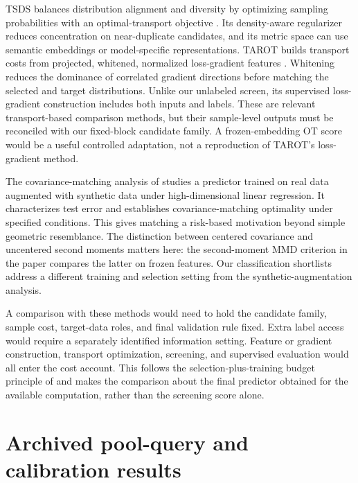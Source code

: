 \documentclass{article}
\begin{document}
TSDS balances distribution alignment and diversity by optimizing sampling probabilities with an optimal-transport objective \citep{liu2024tsds}. Its density-aware regularizer reduces concentration on near-duplicate candidates, and its metric space can use semantic embeddings or model-specific representations. TAROT builds transport costs from projected, whitened, normalized loss-gradient features \citep{feng2025tarot}. Whitening reduces the dominance of correlated gradient directions before matching the selected and target distributions. Unlike our unlabeled screen, its supervised loss-gradient construction includes both inputs and labels. These are relevant transport-based comparison methods, but their sample-level outputs must be reconciled with our fixed-block candidate family. A frozen-embedding OT score would be a useful controlled adaptation, not a reproduction of TAROT's loss-gradient method.

The covariance-matching analysis of \citet{rezaei2026synthetic} studies a predictor trained on real data augmented with synthetic data under high-dimensional linear regression. It characterizes test error and establishes covariance-matching optimality under specified conditions. This gives matching a risk-based motivation beyond simple geometric resemblance. The distinction between centered covariance and uncentered second moments matters here: the second-moment MMD criterion in the paper compares the latter on frozen features. Our classification shortlists address a different training and selection setting from the synthetic-augmentation analysis.

A comparison with these methods would need to hold the candidate family, sample cost, target-data roles, and final validation rule fixed. Extra label access would require a separately identified information setting. Feature or gradient construction, transport optimization, screening, and supervised evaluation would all enter the cost account. This follows the selection-plus-training budget principle of \citet{yin2025} and makes the comparison about the final predictor obtained for the available computation, rather than the screening score alone.

\section{Archived pool-query and calibration results}
\end{document}
